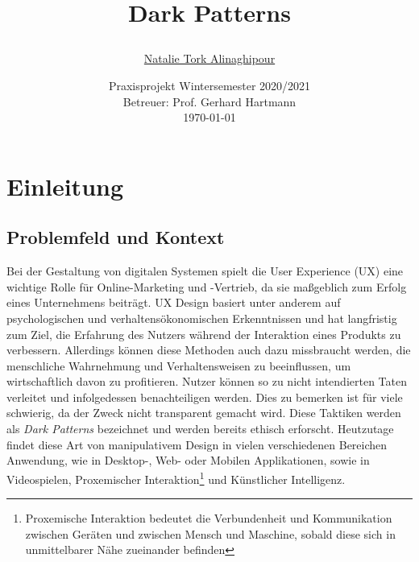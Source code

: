 \documentclass[a4paper]{article}
\begin{document}
	\title{
	\begin{figure}[!ht]
	\end{figure}
	\vspace{1cm}
	\Huge Dark Patterns
	}
	
	\vspace{1cm}

	

	\author{\Large \href{mailto:natalie.tork_alinaghipour@smail.th-koeln.de}{Natalie Tork Alinaghipour} 
	\vspace{1cm}}
	
	\date{
	\large Praxisprojekt Wintersemester 2020/2021 \\ 
	\vspace{0.8cm}
	\large Betreuer: Prof. Gerhard Hartmann \\
	\vspace{1cm}
	\today
	}

	\maketitle
	\setlength{\parindent}{0pt}

\vspace{2cm}
	\newpage
	\tableofcontents
	\newpage
	
\section{Einleitung} 
\label{sec:einleitung}

\subsectionfont{\MakeUppercase}
\subsection{Problemfeld und Kontext}
\label{sub:problemfeld_und_kontext}
Bei der Gestaltung von digitalen Systemen spielt die User Experience (UX) eine wichtige Rolle für Online-Marketing und -Vertrieb, da sie maßgeblich zum Erfolg eines Unternehmens beiträgt. UX Design basiert unter anderem auf psychologischen und verhaltensökonomischen Erkenntnissen und hat langfristig zum Ziel, die Erfahrung des Nutzers während der Interaktion eines Produkts zu verbessern. Allerdings können diese Methoden auch dazu missbraucht werden, die menschliche Wahrnehmung und Verhaltensweisen zu beeinflussen, um wirtschaftlich davon zu profitieren. Nutzer können so zu nicht intendierten Taten verleitet und infolgedessen benachteiligen werden. Dies zu bemerken ist für viele schwierig, da der Zweck nicht transparent gemacht wird.
Diese Taktiken werden als \textit{Dark Patterns} bezeichnet und werden bereits ethisch erforscht. Heutzutage findet diese Art von manipulativem Design in vielen verschiedenen Bereichen Anwendung, wie in Desktop-, Web- oder Mobilen Applikationen, sowie in Videospielen, Proxemischer Interaktion\footnote{\label{foot:1} Proxemische Interaktion bedeutet die Verbundenheit und Kommunikation zwischen Geräten und zwischen Mensch und Maschine, sobald diese sich in unmittelbarer Nähe zueinander befinden} und Künstlicher Intelligenz. 
\end{document}
